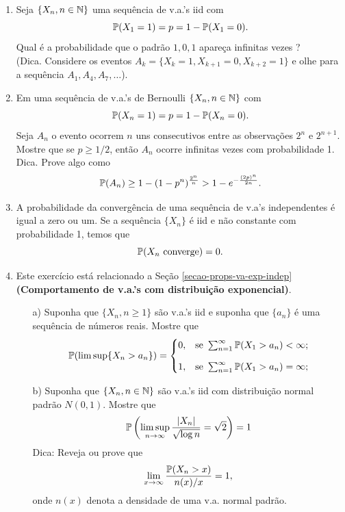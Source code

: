 \begin{enumerate}[leftmargin=*]
\item 
Seja $\{X_n, n\in\N\}$ uma sequência de v.a.'s iid com
	\[
		\P(X_1=1)=p=1-\P(X_1=0).
	\]
Qual é a probabilidade que o padrão $1,0,1$ apareça
infinitas vezes ? 
\\
(Dica. Considere os eventos $A_k=\{X_k=1,X_{k+1}=0,X_{k+2}=1\}$ e 
olhe para a sequência $A_1,A_4,A_7,\ldots$).



\item 
Em uma sequência de v.a.'s de Bernoulli $\{X_n, n\in\N\}$
com 
	\[
		\P(X_n=1)=p=1-\P(X_n=0).
	\]
Seja $A_n$ o evento ocorrem $n$ uns consecutivos entre as 
observações $2^n$ e $2^{n+1}$. Mostre que se $p \geq 1/2$,
então $A_n$ ocorre infinitas vezes com probabilidade 1.
\\
Dica. Prove algo como 
\[
	\P(A_n) \geq 
	1-(1-p^n)^{\frac{2^n}{n}}
	>
	1-e^{-\frac{(2p)^n}{2n}}.		
\]


\item 
A probabilidade da convergência de uma sequência de 
v.a's independentes é igual a zero ou um. 
Se a sequência $\{X_n\}$ é iid e não constante 
com probabilidade 1, temos que 
	\[
		\P(X_n \ \text{converge}) =0.
	\]  








\item
Este exercício está relacionado a Seção 
\ref{secao-props-va-exp-indep}
%
{\bf (Comportamento de v.a.'s com distribuição exponencial)}.
	\begin{itemize}


		\item[a)]
		Suponha que $\{X_n,n\geq 1\}$ são v.a.'s iid e 
		suponha que $\{a_n\}$ é uma sequência de números 
		reais. Mostre que 
			\[
				\P(\limsup \{X_n>a_n\})
				=
				\begin{cases}
					0,&\text{se}\ \sum_{n=1}^{\infty} \P(X_1>a_n)<\infty;
					\\[0.3cm]
					1,&\text{se}\ \sum_{n=1}^{\infty} \P(X_1>a_n)=\infty;
				\end{cases}
			\]


		
		\item[b)] 
		Suponha que $\{X_n,n\in\N\}$ são v.a.'s iid com distribuição 
		normal padrão $N(0,1)$. Mostre que 
			\[
				\P\left( 
				\limsup_{n\to\infty} \frac{|X_n|}{\sqrt{\log n}}
				=\sqrt{2}  
				\right)
				=1
			\]
		Dica: Reveja ou prove que 
			\[
				\lim_{x\to\infty}
				\frac{\P(X_n>x)}{n(x)/x}=1,
			\]
		onde $n(x)$ denota a densidade de uma v.a. normal
		padrão.




\end{itemize}
\end{enumerate}
